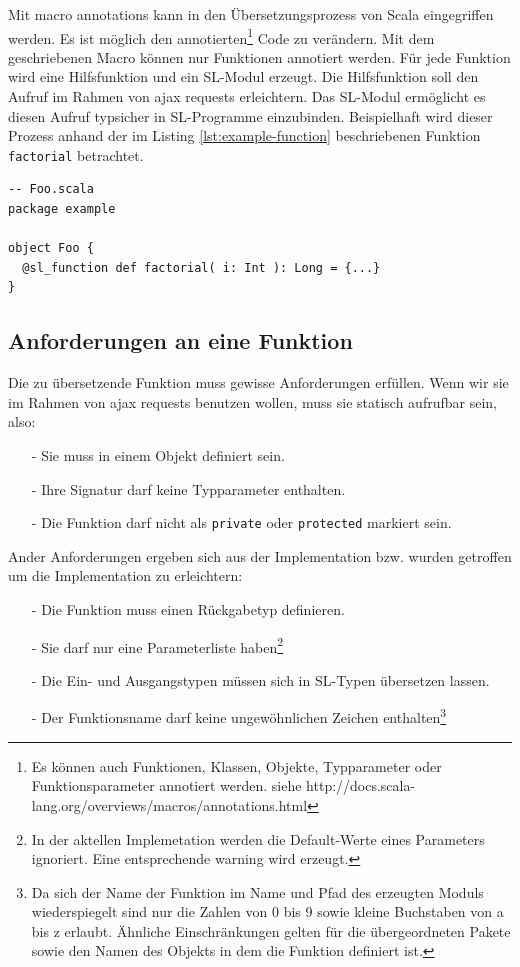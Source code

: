 \documentclass[12pt]{scrreprt}
\begin{document}
Mit macro annotations kann in den Übersetzungsprozess von Scala eingegriffen werden. Es ist möglich den annotierten\footnote{Es können auch Funktionen, Klassen, Objekte, Typparameter oder Funktionsparameter annotiert werden. siehe http://docs.scala-lang.org/overviews/macros/annotations.html} Code zu verändern. Mit dem geschriebenen Macro können nur Funktionen annotiert werden. Für jede Funktion wird eine Hilfsfunktion und ein \ac{SL}-Modul erzeugt. Die Hilfsfunktion soll den Aufruf im Rahmen von ajax requests erleichtern. Das \ac{SL}-Modul ermöglicht es diesen Aufruf typsicher in \ac{SL}-Programme einzubinden. Beispielhaft wird dieser Prozess anhand der im Listing \ref{lst:example-function} beschriebenen Funktion \lstinline!factorial! betrachtet.

\begin{lstlisting}[caption=Scala Beispielfunktion, label=lst:example-function, float=h]
-- Foo.scala
package example

object Foo {
  @sl_function def factorial( i: Int ): Long = {...}
}
\end{lstlisting}

\subsection{Anforderungen an eine Funktion}

Die zu übersetzende Funktion muss gewisse Anforderungen erfüllen. Wenn wir sie im Rahmen von ajax requests benutzen wollen, muss sie statisch aufrufbar sein, also:
\begin{itemize}
  \item[-]{Sie muss in einem Objekt definiert sein.}
  \item[-]{Ihre Signatur darf keine Typparameter enthalten.}
  \item[-]{Die Funktion darf nicht als \lstinline!private! oder \lstinline!protected! markiert sein.}
 \end{itemize}

Ander Anforderungen ergeben sich aus der Implementation bzw. wurden getroffen um die Implementation zu erleichtern:
\begin{itemize}
 \item[-]{Die Funktion muss einen Rückgabetyp definieren.}
 \item[-]{Sie darf nur eine Parameterliste haben\footnote{In der aktellen Implemetation werden die Default-Werte eines Parameters ignoriert. Eine entsprechende warning wird erzeugt.}}
 \item[-]{Die Ein- und Ausgangstypen müssen sich in \ac{SL}-Typen übersetzen lassen.}
 \item[-]{Der Funktionsname darf keine ungewöhnlichen Zeichen enthalten\footnote{Da sich der Name der Funktion im Name und Pfad des erzeugten Moduls wiederspiegelt sind nur die Zahlen von 0 bis 9 sowie kleine Buchstaben von a bis z erlaubt. Ähnliche Einschränkungen gelten für die übergeordneten Pakete sowie den Namen des Objekts in dem die Funktion definiert ist.}}
\end{itemize}
\end{document}
